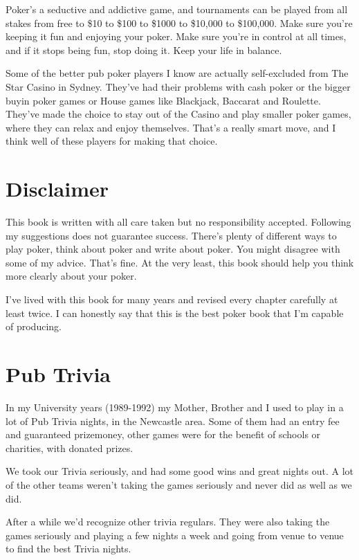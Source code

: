 Poker's a seductive and addictive game,
and tournaments can be played from all stakes from free to \$10 to \$100
to \$1000 to \$10,000 to \$100,000. Make sure you're keeping it fun
and enjoying your poker. Make sure you're in control at all times,
and if it stops being fun, stop doing it. Keep your life in balance.

Some of the better pub poker players I know are actually
self-excluded from The Star Casino in Sydney. They've had
their problems with cash poker or the bigger buyin poker games or
House games like Blackjack, Baccarat and Roulette. They've
made the choice to stay out of the Casino and play smaller poker games,
where they can relax and enjoy themselves. That's a really smart
move, and I think well of these players for making that choice.

\section*{Disclaimer}

This book is written with all care taken but no responsibility accepted.
Following my suggestions does not guarantee success.
There's plenty of different ways to play poker, think about poker
and write about poker. You might disagree with some of my advice.
That's fine. At the very least, this book should help you think
more clearly about your poker.

I've lived with this book for many years and revised every chapter
carefully at least twice. I can honestly say that this is the best
poker book that I'm capable of producing.

\section*{Pub Trivia}

In my University years (1989-1992) my Mother, Brother and I used to
play in a lot of Pub Trivia nights, in the Newcastle area. Some of them
had an entry fee and guaranteed prizemoney, other games were for the
benefit of schools or charities, with donated prizes.

We took our Trivia seriously, and had some good wins and
great nights out. A lot of the other teams weren't taking the games
seriously and never did as well as we did.

After a while we'd recognize other trivia regulars. They were also taking
the games seriously and playing a few nights a week and going from venue
to venue to find the best Trivia nights.

